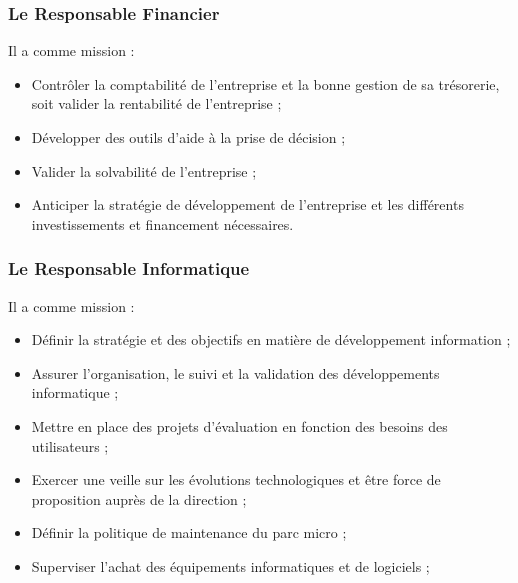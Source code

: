             \subsubsection[Le Responsable Financier]{Le Responsable Financier}
            Il a comme mission :
            \par
                \begin{itemize}
                    \setlength{\itemsep}{0pt}
                    \item [\ding{226}] Contrôler la comptabilité de l’entreprise et la bonne
                    gestion de sa trésorerie, soit valider la rentabilité de l’entreprise ;
                    \item [\ding{226}] Développer des outils d’aide à la prise de décision ;
                    \item [\ding{226}] Valider la solvabilité de l’entreprise ;
                    \item [\ding{226}] Anticiper la stratégie de développement de l’entreprise
                    et les différents investissements et financement nécessaires.
                \end{itemize}
            \subsubsection[Le Responsable Informatique]{Le Responsable Informatique}
            Il a comme mission :
            \par
                \begin{itemize}
                    \setlength{\itemsep}{0pt}
                    \item [\ding{226}] Définir la stratégie et des objectifs en matière de développement information ;
                    \item [\ding{226}] Assurer l’organisation, le suivi et la validation des développements informatique ;
                    \item [\ding{226}] Mettre en place des projets d’évaluation en fonction des
                    besoins des utilisateurs ;
                    \item [\ding{226}] Exercer une veille sur les évolutions technologiques et
                    être force de proposition auprès de la direction ;
                    \item [\ding{226}] Définir la politique de maintenance du parc micro ;
                    \item [\ding{226}] Superviser l’achat des équipements informatiques et de logiciels ;
                \end{itemize}

